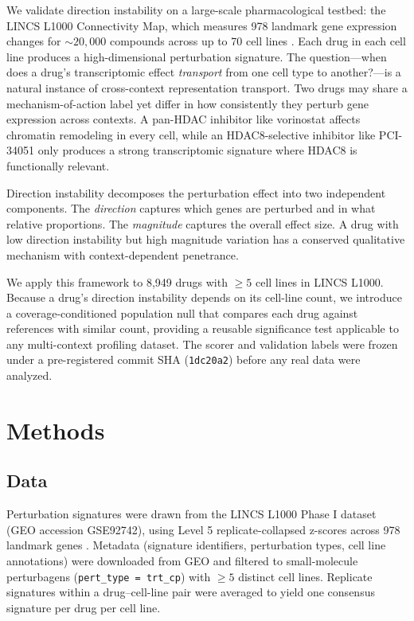 \documentclass{article}
\begin{document}
We validate direction instability on a large-scale pharmacological
testbed: the LINCS L1000 Connectivity Map, which measures 978 landmark
gene expression changes for ${\sim}20{,}000$ compounds across up to 70
cell lines \citep{subramanian2017next,lamb2006connectivity}. Each drug
in each cell line produces a high-dimensional perturbation signature.
The question---when does a drug's transcriptomic effect \emph{transport}
from one cell type to another?---is a natural instance of cross-context
representation transport. Two drugs may share a mechanism-of-action
label yet differ in how consistently they perturb gene expression across
contexts. A pan-HDAC inhibitor like vorinostat affects chromatin
remodeling in every cell, while an HDAC8-selective inhibitor like
PCI-34051 only produces a strong transcriptomic signature where HDAC8
is functionally relevant.

Direction instability decomposes the perturbation effect into two
independent components. The \emph{direction} captures which genes are
perturbed and in what relative proportions. The \emph{magnitude} captures
the overall effect size. A drug with low direction instability but high
magnitude variation has a conserved qualitative mechanism with
context-dependent penetrance.

We apply this framework to 8{,}949 drugs with $\geq5$ cell lines in
LINCS L1000. Because a drug's direction instability depends on its
cell-line count, we introduce a coverage-conditioned population null
that compares each drug against references with similar count, providing
a reusable significance test applicable to any multi-context profiling
dataset. The scorer and validation labels were frozen under a
pre-registered commit SHA (\texttt{1dc20a2}) before any real data were
analyzed.

\section{Methods}

\subsection{Data}

Perturbation signatures were drawn from the LINCS L1000 Phase I dataset
(GEO accession GSE92742), using Level 5 replicate-collapsed z-scores across
978 landmark genes \citep{subramanian2017next}. Metadata (signature
identifiers, perturbation types, cell line annotations) were downloaded from
GEO and filtered to small-molecule perturbagens (\texttt{pert\_type =
trt\_cp}) with $\geq5$ distinct cell lines. Replicate signatures within a
drug--cell-line pair were averaged to yield one consensus signature per
drug per cell line.
\end{document}
